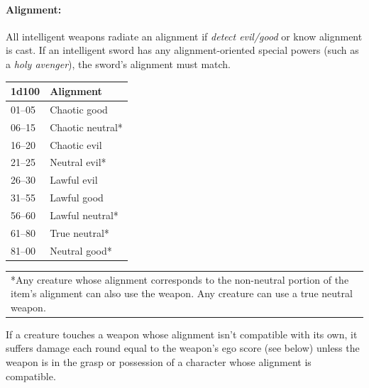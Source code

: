 \begin{multicols}{2}
\begin{minipage}{\columnwidth}
\end{minipage}

\paragraph{Alignment:} All intelligent weapons radiate an alignment if \textit{detect evil/good} or know alignment is cast.  If an intelligent sword has any alignment-oriented special powers (such as a \textit{holy avenger}), the sword's alignment must match.

\noindent \begin{minipage}{\columnwidth}

\label{weaponalign}
\noindent \begin{tabular}{|p{}|p{}|}
\hline
1d100	& Alignment \\
\hline\hline
\rowcolor[gray]{0.9}01--05	& Chaotic good \\
06--15	& Chaotic neutral* \\
\rowcolor[gray]{0.9}16--20	& Chaotic evil \\
21--25	& Neutral evil* \\
\rowcolor[gray]{0.9}26--30	& Lawful evil \\
31--55	& Lawful good \\
\rowcolor[gray]{0.9}56--60	& Lawful neutral* \\
61--80	& True neutral* \\
\rowcolor[gray]{0.9}81--00	& Neutral good* \\
\hline
\end{tabular}
\noindent\begin{tabular}{p{}}
*Any creature whose alignment corresponds to the non-neutral portion of the item's alignment can also use the weapon.  Any creature can use a true neutral weapon. \\
\end{tabular}\vspace{.5em}

\end{minipage}

If a creature touches a weapon whose alignment isn't compatible with its own, it suffers damage each round equal to the weapon's ego score (see below) unless the weapon is in the grasp or possession of a character whose alignment is compatible.


\end{multicols}
